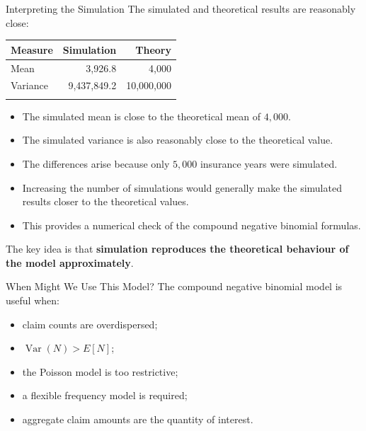 \documentclass[
  ignorenonframetext,
  aspectratio=169,
]{beamer}
\newcounter{none} %
\providecommand{\tightlist}{%
  \setlength{\itemsep}{0pt}\setlength{\parskip}{0pt}}
\begin{document}
\begin{frame}{Interpreting the Simulation}
\protect{}\label{interpreting-the-simulation}
The simulated and theoretical results are reasonably close:

{\def\LTcaptype{none} %
\begin{longtable}[]{@{}lrr@{}}
\toprule\noalign{}
Measure & Simulation & Theory \\
\midrule\noalign{}
\endhead
Mean & 3,926.8 & 4,000 \\
Variance & 9,437,849.2 & 10,000,000 \\
\bottomrule\noalign{}
\end{longtable}
}

\begin{itemize}
\tightlist
\item
  The simulated mean is close to the theoretical mean of \(4,000\).
\item
  The simulated variance is also reasonably close to the theoretical
  value.
\item
  The differences arise because only \(5,000\) insurance years were
  simulated.
\item
  Increasing the number of simulations would generally make the
  simulated results closer to the theoretical values.
\item
  This provides a numerical check of the compound negative binomial
  formulas.
\end{itemize}

The key idea is that \textbf{simulation reproduces the theoretical
behaviour of the model approximately}.
\end{frame}

\begin{frame}{When Might We Use This Model?}
\protect{}\label{when-might-we-use-this-model}
The compound negative binomial model is useful when:

\begin{itemize}
\tightlist
\item
  claim counts are overdispersed;
\item
  \(\operatorname{Var}(N)>E[N]\);
\item
  the Poisson model is too restrictive;
\item
  a flexible frequency model is required;
\item
  aggregate claim amounts are the quantity of interest.
\end{itemize}
\end{frame}
\end{document}
